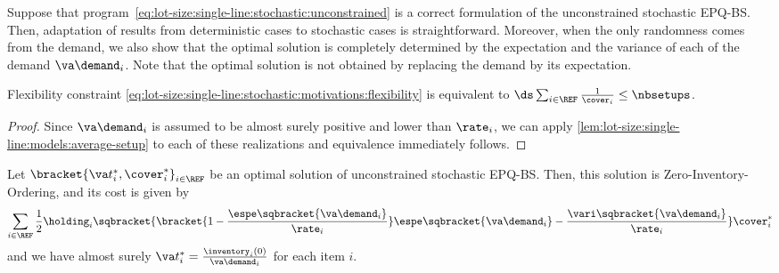 Suppose that program~\eqref{eq:lot-size:single-line:stochastic:unconstrained} is a correct formulation of the unconstrained stochastic EPQ-BS. Then, adaptation of results from deterministic cases to stochastic cases is straightforward.
Moreover, when the only randomness comes from the demand, we also show that the optimal solution is completely determined by the expectation and the variance of each of the demand $\va\demand_i$.
Note that the optimal solution is not obtained by replacing the demand by its expectation.







\begin{lem}\label{lem:lot-size:stochastic:single-line:models:average-setup}
Flexibility constraint \eqref{eq:lot-size:single-line:stochastic:motivations:flexibility} is equivalent to
$\ds\sum_{i\in\REF} \frac{1}{\cover_i} \le \nbsetups$.
\end{lem}


\begin{proof}
Since $\va\demand_i$ is assumed to be almost surely positive and lower than $\rate_i$, we can apply \cref{lem:lot-size:single-line:models:average-setup} to each of these realizations and equivalence immediately follows.
\end{proof}



\begin{lem}\label{lem:lot-size:stochastic:single-line:models:ZIO}
Let $\bracket{\va t_i^*,\cover_i^*}_{i\in\REF}$ be an optimal solution of unconstrained stochastic EPQ-BS.
Then, this solution is Zero-Inventory-Ordering, and its cost is given by
\begin{equation}
  \sum_{i\in\REF}\frac{1}{2}\holding_i\sqbracket{\bracket{1-\frac{\espe\sqbracket{\va\demand_i}}{\rate_i}}\espe\sqbracket{\va\demand_i} - \frac{\vari\sqbracket{\va\demand_i}}{\rate_i}}\cover_i^*
\end{equation}
and we have almost surely $\va t_i^*=\frac{\inventory_i(0)}{\va\demand_i}$ for each item $i$.
\end{lem}


